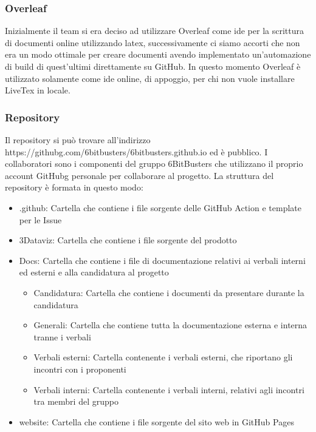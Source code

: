        
        \subsubsection{Overleaf}
        Inizialmente il team si era deciso ad utilizzare Overleaf come ide per la scrittura di documenti online utilizzando latex, successivamente ci siamo accorti
        che non era un modo ottimale per creare documenti avendo implementato un'automazione di build di quest'ultimi direttamente su GitHub.
        In questo momento Overleaf è utilizzato solamente come ide online, di appoggio, per chi non vuole installare LiveTex in locale.
        
        
        \subsubsection{Repository}
        Il repository si può trovare all'indirizzo https://githubg.com/6bitbusters/6bitbusters.github.io ed è pubblico.
        I collaboratori sono i componenti del gruppo 6BitBusters che utilizzano il proprio account GitHubg
        personale per collaborare al progetto.
        La struttura del repository è formata in questo modo:
            \begin{itemize}
                \item .github: Cartella che contiene i file sorgente delle GitHub Action e template per le Issue
                \item 3Dataviz: Cartella che contiene i file sorgente del prodotto
                \item Docs: Cartella che contiene i file di documentazione relativi ai verbali interni ed esterni e alla candidatura al progetto
                    \begin{itemize}
                        \item Candidatura: Cartella che contiene i documenti da presentare durante la candidatura
                        \item Generali: Cartella che contiene tutta la documentazione esterna e interna tranne i verbali
                        \item Verbali esterni: Cartella contenente i verbali esterni, che riportano gli incontri con i proponenti
                        \item Verbali interni: Cartella contenente i verbali interni, relativi agli incontri tra membri del gruppo
                    \end{itemize}
                \item website: Cartella che contiene i file sorgente del sito web in GitHub Pages
            \end{itemize}
